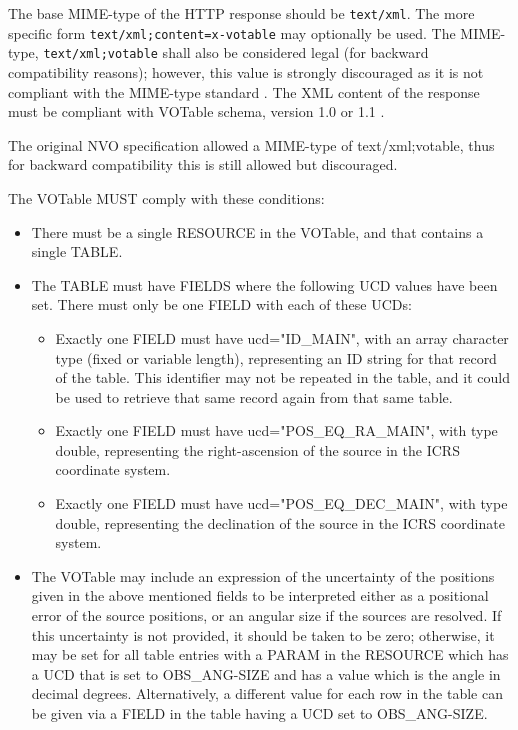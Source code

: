 \documentclass[11pt,a4paper]{ivoa}
\begin{document}
\begin{enumerate}
	The base MIME-type of the HTTP response should be \texttt{text/xml}. The more specific form \texttt{text/xml;content=x-votable} may optionally be used. The MIME-type, \texttt{text/xml;votable} shall also be considered legal (for backward compatibility reasons); however, this value is strongly discouraged as it is not compliant with the MIME-type standard \citep{std:MIME}. The XML content of the response must be compliant with VOTable schema, version 1.0 \citep{std:VOT11} or 1.1 \citep{2004ivoa.spec.0811O}.
	The VOTable MUST comply with these conditions:
	\begin{itemize}
		\item There must be a single RESOURCE in the VOTable, and that contains a single TABLE.
		\item The TABLE must have FIELDS where the following UCD  values have been set. There must only be one FIELD with each of these UCDs:
		\begin{itemize}
			\item Exactly one FIELD must have ucd="ID\_MAIN", with an array character type (fixed or variable length), representing an ID string for that record of the table. This identifier may not be repeated in the table, and it could be used to retrieve that same record again from that same table.
			\item Exactly one FIELD must have ucd="POS\_EQ\_RA\_MAIN", with type double, representing the right-ascension of the source in the ICRS coordinate system.
			\item Exactly one FIELD must have ucd="POS\_EQ\_DEC\_MAIN", with type double, representing the declination of the source in the ICRS coordinate system.
		\end{itemize}
		\item 	The VOTable may include an expression of the uncertainty of the positions given in the above mentioned fields to be interpreted either as a positional error of the source positions, or an angular size if the sources are resolved. If this uncertainty is not provided, it should be taken to be zero; otherwise, it may be set for all table entries with a PARAM in the RESOURCE which has a UCD that is set to OBS\_ANG-SIZE and has a value which is the angle in decimal degrees. Alternatively, a different value for each row in the table can be given via a FIELD in the table having a UCD set to OBS\_ANG-SIZE.

\end{itemize}
\end{enumerate}
\end{document}
